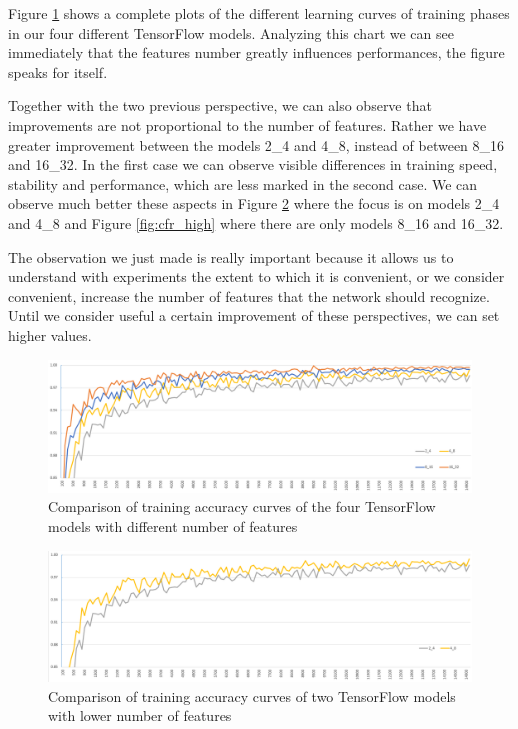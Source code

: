 Figure \ref{fig:cfr_all} shows a complete plots of the different learning curves of training phases in our four different TensorFlow models. Analyzing this chart we can see immediately that the features number greatly influences performances, the figure speaks for itself.

Together with the two previous perspective, we can also observe that improvements are not proportional to the number of features. Rather we have greater improvement between the models 2\_4 and 4\_8, instead of between 8\_16 and 16\_32. In the first case we can observe visible differences in training speed, stability and performance, which are less marked in the second case. We can observe much better these aspects in Figure \ref{fig:cfr_low} where the focus is on models 2\_4 and 4\_8 and Figure \ref{fig:cfr_high} where there are only models 8\_16 and 16\_32.

The observation we just made is really important because it allows us to understand with experiments the extent to which it is convenient, or we consider convenient, increase the number of features that the network should recognize. Until we consider useful a certain improvement of these perspectives, we can set higher values. 

\begin{landscape}
	\begin{figure}
		\centering
		\includegraphics[width=1\textheight]{Images/cfr_all}
		\caption{Comparison of training accuracy curves of the four TensorFlow models with different number of features}
		\label{fig:cfr_all}
	\end{figure}
\end{landscape}

\begin{landscape}
\begin{figure}
	\centering
	\includegraphics[width=1\textheight]{Images/cfr_2_4_vs_4_8}
	\caption{Comparison of training accuracy curves of two TensorFlow models with lower number of features}
	\label{fig:cfr_low}
\end{figure}
\end{landscape}


